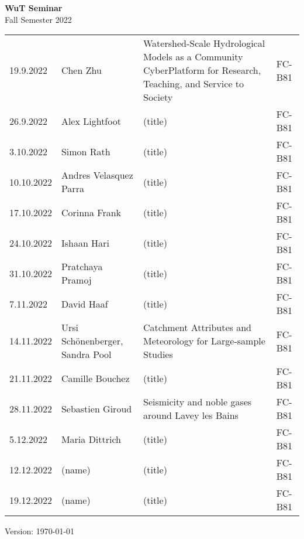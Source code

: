 \documentclass[12pt]{article}
\begin{document}
\centering

{\Huge \bf WuT Seminar}\\[1cm]
{\Large Fall Semester 2022}\\[1.8cm]





\renewcommand*\arraystretch{1.4}
\begin{tabular}{l p{3.8cm} p{8.5cm} p{2cm}}

19.9.2022
 	& Chen Zhu
 	& Watershed-Scale Hydrological Models as a Community CyberPlatform for Research, Teaching, and Service to Society
  & FC-B81\\
  
26.9.2022
 	& Alex Lightfoot
 	& (title)
 	& FC-B81\\

3.10.2022
 	& Simon Rath
 	& (title)
 	& FC-B81\\

10.10.2022
 	& Andres Velasquez Parra
 	& (title)
 	& FC-B81\\

17.10.2022
 	& Corinna Frank
 	& (title)
 	& FC-B81\\
 	
24.10.2022
 	& Ishaan Hari
 	& (title)
 	& FC-B81\\

31.10.2022
 	& Pratchaya Pramoj
 	& (title)
 	& FC-B81\\

7.11.2022
 	& David Haaf
 	& (title)
 	& FC-B81\\

14.11.2022
 	& Ursi Schönenberger, Sandra Pool
 	& Catchment Attributes and Meteorology for Large-sample Studies
 	& FC-B81\\

21.11.2022
 	& Camille Bouchez
 	& (title)
 	& FC-B81\\

28.11.2022
 	& Sebastien Giroud
 	& Seismicity and noble gases around Lavey les Bains
 	& FC-B81\\

5.12.2022
 	& Maria Dittrich
 	& (title)
 	& FC-B81\\

12.12.2022
 	& (name)
 	& (title)
 	& FC-B81\\

19.12.2022
 	& (name)
 	& (title)
 	& FC-B81\\


\end{tabular}

\vfill

{\scriptsize Version: \today}
\end{document}
